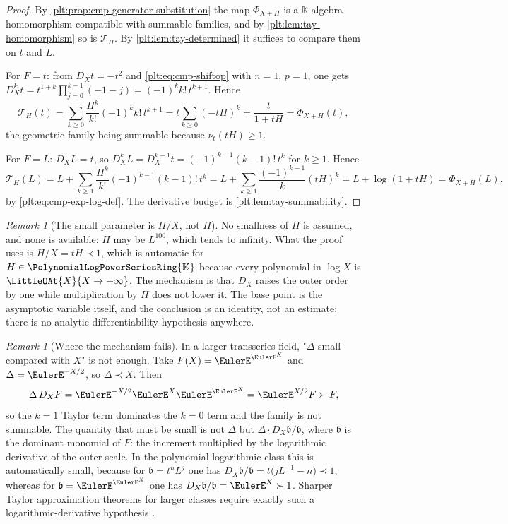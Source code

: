 \documentclass[11pt,oneside]{article}
\theoremstyle{plain}
\theoremstyle{definition}
\theoremstyle{remark}
\newtheorem{remark}[theorem]{Remark}
\newcommand{\K}{\mathbb{K}}
\newcommand{\PLpow}{\PolynomialLogPowerSeriesRing{\K}}   %
\newcommand{\ordt}{\nu_{t}}                              %
\newcommand{\DX}{D_{X}}                                  %
\newcommand{\precdom}{\prec}
\newcommand{\succdom}{\succ}
\begin{document}
\begin{proof}
By \cref{plt:prop:cmp-generator-substitution} the map
\(\Phi_{X+H}\) is a \(\K\)-algebra homomorphism compatible with summable
families, and by \cref{plt:lem:tay-homomorphism} so is
\(\mathcal T_{H}\).  By \cref{plt:lem:tay-determined} it suffices to compare
them on \(t\) and \(L\).

For \(F=t\): from \(\DX t=-t^{2}\) and
\eqref{plt:eq:cmp-shiftop} with \(n=1\), \(p=1\), one gets
\(\DX^{k}t=t^{1+k}\prod_{j=0}^{k-1}(-1-j)=(-1)^{k}k!\,t^{k+1}\).  Hence
\[
 \mathcal T_{H}(t)
 =\sum_{k\ge0}\frac{H^{k}}{k!}(-1)^{k}k!\,t^{k+1}
 =t\sum_{k\ge0}(-tH)^{k}
 =\frac{t}{1+tH}
 =\Phi_{X+H}(t),
\]
the geometric family being summable because \(\ordt(tH)\ge1\).

For \(F=L\): \(\DX L=t\), so
\(\DX^{k}L=\DX^{k-1}t=(-1)^{k-1}(k-1)!\,t^{k}\) for \(k\ge1\).  Hence
\[
 \mathcal T_{H}(L)
 =L+\sum_{k\ge1}\frac{H^{k}}{k!}(-1)^{k-1}(k-1)!\,t^{k}
 =L+\sum_{k\ge1}\frac{(-1)^{k-1}}{k}(tH)^{k}
 =L+\log(1+tH)
 =\Phi_{X+H}(L),
\]
by \eqref{plt:eq:cmp-exp-log-def}.  The derivative budget is
\cref{plt:lem:tay-summability}.
\end{proof}

\begin{remark}[The small parameter is \(H/X\), not \(H\)]
\label{plt:rmk:tay-small-parameter}
No smallness of \(H\) is assumed, and none is available: \(H\) may be
\(L^{100}\), which tends to infinity.  What the proof uses is
\(H/X=tH\precdom1\), which is automatic for \(H\in\PLpow\) because every
polynomial in \(\log X\) is \(\LittleOAt{X}{X\to+\infty}\).  The mechanism is
that \(\DX\) raises the outer order by one while multiplication by \(H\) does
not lower it.  The base point is the asymptotic variable itself, and the
conclusion is an identity, not an estimate; there is no analytic
differentiability hypothesis anywhere.
\end{remark}

\begin{remark}[Where the mechanism fails]\label{plt:rmk:tay-failure}
In a larger transseries field, "\(\Delta\) small compared with \(X\)" is not
enough.  Take \(F(X)=\EulerE^{\EulerE^{X}}\) and
\(\Delta=\EulerE^{-X/2}\), so \(\Delta\precdom X\).  Then
\[
 \Delta\,\DX F
 =\EulerE^{-X/2}\EulerE^{X}\EulerE^{\EulerE^{X}}
 =\EulerE^{X/2}F\succdom F,
\]
so the \(k=1\) Taylor term dominates the \(k=0\) term and the family is not
summable.  The quantity that must be small is not \(\Delta\) but
\(\Delta\cdot\DX\mathfrak b/\mathfrak b\), where \(\mathfrak b\) is the
dominant monomial of \(F\): the increment multiplied by the logarithmic
derivative of the outer scale.  In the polynomial-logarithmic class this is
automatically small, because for \(\mathfrak b=t^{n}L^{j}\) one has
\(\DX\mathfrak b/\mathfrak b=t\bigl(jL^{-1}-n\bigr)\precdom1\), whereas for
\(\mathfrak b=\EulerE^{\EulerE^{X}}\) one has
\(\DX\mathfrak b/\mathfrak b=\EulerE^{X}\succdom1\).  Sharper Taylor
approximation theorems for larger classes require exactly such a
logarithmic-derivative hypothesis
\cite{edgar-composition,mantova-monotonicity}.
\end{remark}
\end{document}
